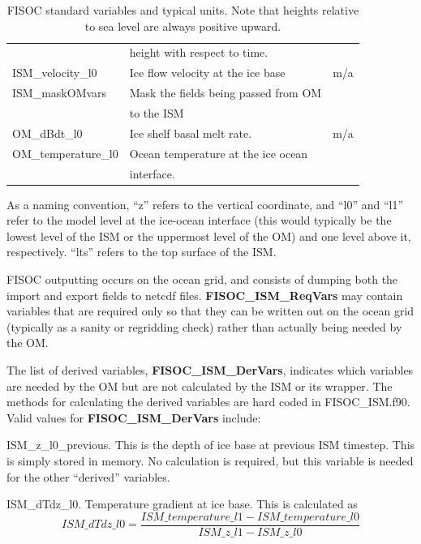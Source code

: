 \documentclass[12pt]{article}
\begin{document}
\begin{table}
\begin{center}
\begin{tabular}{ l|l|l }
                            & height with respect to time.                 &   \\
      ISM\_velocity\_l0     & Ice flow velocity at the ice base            & m/a \\
      ISM\_maskOMvars       & Mask the fields being passed from OM         &   \\
                            & to the ISM                                   &   \\
      OM\_dBdt\_l0          & Ice shelf basal melt rate.                   & m/a \\
      OM\_temperature\_l0   & Ocean temperature at the ice ocean           &   \\
                            & interface.                                   &   \\
    \end{tabular}
  \end{center}
  \caption{FISOC standard variables and typical units.  
    Note that heights relative to sea level are always positive upward.}
  \label{tab:vars}
\end{table}

As a naming convention, ``z'' refers to the vertical coordinate, and ``l0'' and ``l1'' refer to the 
model level at the ice-ocean interface (this would typically be the lowest level of the ISM or 
the uppermost level of the OM) and one level above it, respectively. ``lts'' refers to the top 
surface of the ISM.

FISOC outputting occurs on the ocean grid, and consists of dumping both the import and 
export fields to netcdf files. 
\textbf{FISOC\_ISM\_ReqVars} may contain variables that are required only so that they can be written 
out on the ocean grid (typically as a sanity or regridding check) rather 
than actually being needed by the OM.

The list of derived variables, \textbf{FISOC\_ISM\_DerVars}, indicates which variables are needed by the 
OM but are not calculated by the ISM or its wrapper. 
The methods for calculating the derived variables are hard coded in FISOC\_ISM.f90. 
Valid values for  \textbf{FISOC\_ISM\_DerVars} include:

ISM\_z\_l0\_previous.  This is the depth of ice base at previous ISM timestep. This is simply stored 
in memory.  No calculation is required, but this variable is needed for the other ``derived'' variables. 

ISM\_dTdz\_l0.  Temperature gradient at ice base.  This is calculated as 
\begin{equation}
ISM\_dTdz\_l0 = \frac{ISM\_temperature\_l1 - ISM\_temperature\_l0}{ISM\_z\_l1 - ISM\_z\_l0}
\end{equation}
\end{document}
